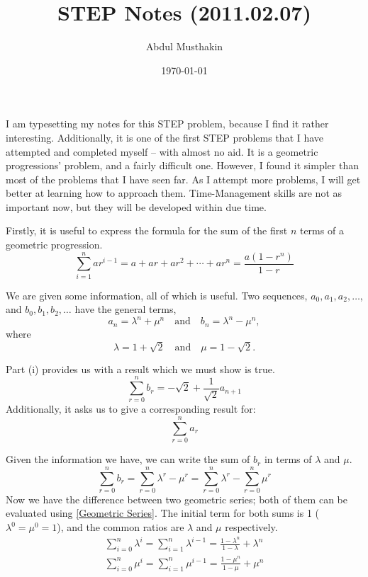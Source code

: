 \documentclass[a4paper]{article}
\title{STEP Notes (2011.02.07)}
\author{Abdul Musthakin}
\date{\today}
\begin{document}
\maketitle

I am typesetting my notes for this STEP problem, because I find it rather interesting.
Additionally, it is one of the first STEP problems that I have attempted and completed myself -- with almost no aid.
It is a geometric progressions' problem, and a fairly difficult one.
However, I found it simpler than most of the problems that I have seen far.
As I attempt more problems, I will get better at learning how to approach them.
Time-Management skills are not as important now, but they will be developed within due time.

Firstly, it is useful to express the formula for the sum of the first $n$ terms of a geometric progression.
\begin{equation}
    \sum_{i=1}^n ar^{i-1} = a + ar + ar^2 + \cdots + ar^n = \frac{a(1-r^n)}{1-r} \label{Geometric Series}
\end{equation}

We are given some information, all of which is useful.
Two sequences, $a_0, a_1, a_2, \ldots$, and $b_0, b_1, b_2, \ldots$ have the general terms,
\begin{equation*}
    a_n = \lambda^n + \mu^n \quad \text{and} \quad b_n = \lambda^n - \mu^n,
\end{equation*}
where
\begin{equation*}
    \lambda = 1 + \sqrt{2} \quad \text{and} \quad \mu = 1 - \sqrt{2}.
\end{equation*}

Part (i) provides us with a result which we must show is true.
\begin{equation}
    \sum_{r=0}^{n} b_r = -\sqrt{2} + \frac{1}{\sqrt{2}} a_{n+1}
\end{equation}
Additionally, it asks us to give a corresponding result for:
\begin{equation*}
    \sum_{r=0}^{n} a_r
\end{equation*}

Given the information we have, we can write the sum of $b_r$ in terms of $\lambda$ and $\mu$.
\begin{equation*}
    \sum_{r=0}^{n} b_r = \sum_{r=0}^{n} \lambda^r - \mu^r = \sum_{r=0}^{n} \lambda^r - \sum_{r=0}^{n} \mu^r
\end{equation*}
Now we have the difference between two geometric series; both of them can be evaluated using \eqref{Geometric Series}.
The initial term for both sums is 1 ($\lambda^0=\mu^0=1$), and the common ratios are $\lambda$ and $\mu$ respectively.
\begin{align}
    \sum_{i=0}^{n} \lambda^i = \sum_{i=1}^{n} \lambda^{i-1} = \frac{1-\lambda^n}{1-\lambda} + \lambda^n \\
    \sum_{i=0}^{n} \mu^i = \sum_{i=1}^{n} \mu^{i-1} = \frac{1-\mu^n}{1-\mu} + \mu^n
\end{align}
\end{document}
